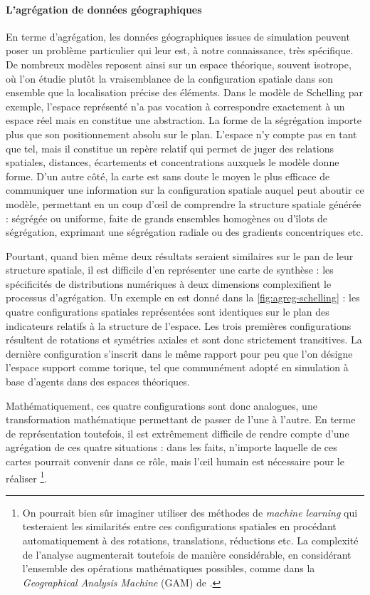 \documentclass[a4paper, 12pt]{article}
\begin{document}
\paragraph{L'agrégation de données géographiques}

En terme d'agrégation, les données géographiques issues de simulation peuvent poser un problème particulier qui leur est, à notre connaissance, très spécifique.
De nombreux modèles reposent ainsi sur un espace théorique, souvent isotrope, où l'on étudie plutôt la vraisemblance de la configuration spatiale dans son ensemble que la localisation précise des éléments.
Dans le modèle de Schelling par exemple, l'espace représenté n'a pas vocation à correspondre exactement à un espace réel mais en constitue une abstraction.
La forme de la ségrégation importe plus que son positionnement absolu sur le plan.
L'espace n'y compte pas en tant que tel, mais il constitue un repère relatif qui permet de juger des relations spatiales, distances, écartements et concentrations auxquels le modèle donne forme.
D'un autre côté, la carte est sans doute le moyen le plus efficace de communiquer une information sur la configuration spatiale auquel peut aboutir ce modèle, permettant en un coup d'œil de comprendre la structure spatiale générée : ségrégée ou uniforme, faite de grands ensembles homogènes ou d'îlots de ségrégation, exprimant une ségrégation radiale ou des gradients concentriques etc.

Pourtant, quand bien même deux résultats seraient similaires sur le pan de leur structure spatiale, il est difficile d'en représenter une carte de synthèse : les spécificités de distributions numériques à deux dimensions complexifient le processus d'agrégation.
Un exemple en est donné dans la \cref{fig:agreg-schelling} : les quatre configurations spatiales représentées sont identiques sur le plan des indicateurs relatifs à la structure de l'espace. Les trois premières configurations résultent de rotations et symétries axiales et sont donc strictement transitives.
La dernière configuration s'inscrit dans le même rapport pour peu que l'on désigne l'espace support comme torique, tel que communément adopté en simulation à base d'agents dans des espaces théoriques.

Mathématiquement, ces quatre configurations sont donc analogues, une transformation mathématique permettant de passer de l'une à l'autre.
En terme de représentation toutefois, il est extrêmement difficile de rendre compte d'une agrégation de ces quatre situations : dans les faits, n'importe laquelle de ces cartes pourrait convenir dans ce rôle, mais l'œil humain est nécessaire pour le réaliser \footnote{
On pourrait bien sûr imaginer utiliser des méthodes de \textit{machine learning} qui testeraient les similarités entre ces configurations spatiales en procédant automatiquement à des rotations, translations, réductions etc.
La complexité de l'analyse augmenterait toutefois de manière considérable, en considérant l'ensemble des opérations mathématiques possibles, comme dans la \og \textit{Geographical Analysis Machine}\fg{} (GAM) de \textcite{openshaw_mark_1987}.
}.
\end{document}
